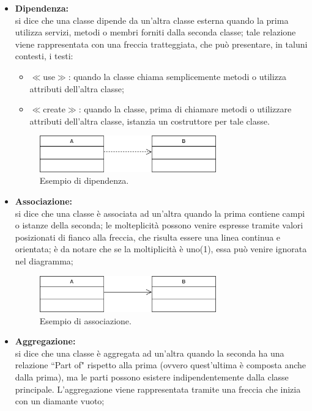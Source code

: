 \documentclass[8pt]{article}
\begin{document}
 \begin{itemize}
    \item \textbf{Dipendenza:}\\ si dice che una classe dipende da un'altra classe esterna quando la prima utilizza servizi, metodi o membri forniti dalla seconda classe; tale relazione viene rappresentata con una freccia tratteggiata, che può presentare, in taluni contesti, i testi:
        \begin{itemize}
            \item $\ll$use$\gg$: quando la classe chiama semplicemente metodi o utilizza attributi dell'altra classe;
            \item $\ll$create$\gg$: quando la classe, prima di chiamare metodi o utilizzare attributi dell'altra classe, istanzia un costruttore per tale classe.
        \end{itemize}
        \begin{figure}[h!]
            \centering
            \includegraphics[width=0.72\textwidth]{images_ndp/dependency.png}
            \caption{Esempio di dipendenza.}
            \label{fig:Esempio di dipendenza}
        \end{figure}
    \item \textbf{Associazione:}\\ si dice che una classe è associata ad un'altra quando la prima contiene campi o istanze della seconda; le molteplicità possono venire espresse tramite valori posizionati di fianco alla freccia, che risulta essere una linea continua e orientata; è da notare che se la moltiplicità è uno(1), essa può venire ignorata nel diagramma;
    \begin{figure}[h!]
        \centering
        \includegraphics[width=0.72\textwidth]{images_ndp/association.png}
        \caption{Esempio di associazione.}
        \label{fig:Esempio di associazione}
    \end{figure}
    \item \textbf{Aggregazione:}\\ si dice che una classe è aggregata ad un'altra quando la seconda ha una relazione ``Part of" rispetto alla prima (ovvero quest'ultima è composta anche dalla prima), ma le parti possono esistere indipendentemente dalla classe principale. L'aggregazione viene rappresentata tramite una freccia che inizia con un diamante vuoto;

\end{itemize}
\end{document}

